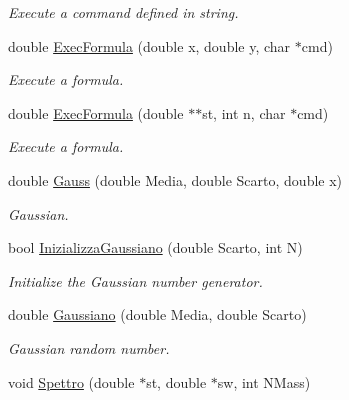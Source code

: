 \begin{DoxyCompactItemize}
\begin{DoxyCompactList}\small\item\em \-Execute a command defined in string. \end{DoxyCompactList}\item 
\hypertarget{classMatematica_aa8b3417ffb15a1c67df01163d9d2fc35}{double \hyperlink{classMatematica_aa8b3417ffb15a1c67df01163d9d2fc35}{\-Exec\-Formula} (double x, double y, char $\ast$cmd)}\label{classMatematica_aa8b3417ffb15a1c67df01163d9d2fc35}

\begin{DoxyCompactList}\small\item\em \-Execute a formula. \end{DoxyCompactList}\item 
\hypertarget{classMatematica_a2d18b53fcf726b2a08d6c737033bde80}{double \hyperlink{classMatematica_a2d18b53fcf726b2a08d6c737033bde80}{\-Exec\-Formula} (double $\ast$$\ast$st, int n, char $\ast$cmd)}\label{classMatematica_a2d18b53fcf726b2a08d6c737033bde80}

\begin{DoxyCompactList}\small\item\em \-Execute a formula. \end{DoxyCompactList}\item 
\hypertarget{classMatematica_a21b0d93a1241a634ee8719c941619e4b}{double \hyperlink{classMatematica_a21b0d93a1241a634ee8719c941619e4b}{\-Gauss} (double \-Media, double \-Scarto, double x)}\label{classMatematica_a21b0d93a1241a634ee8719c941619e4b}

\begin{DoxyCompactList}\small\item\em \-Gaussian. \end{DoxyCompactList}\item 
\hypertarget{classMatematica_af622f5a2f12722fd5ed7f8840fa730bd}{bool \hyperlink{classMatematica_af622f5a2f12722fd5ed7f8840fa730bd}{\-Inizializza\-Gaussiano} (double \-Scarto, int \-N)}\label{classMatematica_af622f5a2f12722fd5ed7f8840fa730bd}

\begin{DoxyCompactList}\small\item\em \-Initialize the \-Gaussian number generator. \end{DoxyCompactList}\item 
double \hyperlink{classMatematica_ad14013038c5963ed49ca1236e681db10}{\-Gaussiano} (double \-Media, double \-Scarto)
\begin{DoxyCompactList}\small\item\em \-Gaussian random number. \end{DoxyCompactList}\item 
\hypertarget{classMatematica_abe4888052d3a0b30d84f2b4c7a523328}{void \hyperlink{classMatematica_abe4888052d3a0b30d84f2b4c7a523328}{\-Spettro} (double $\ast$st, double $\ast$sw, int \-N\-Mass)}\label{classMatematica_abe4888052d3a0b30d84f2b4c7a523328}


\end{DoxyCompactItemize}

